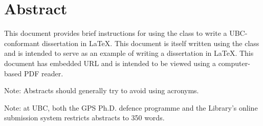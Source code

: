 
\chapter{Abstract}

This document provides brief instructions for using the 
class to write a UBC-conformant dissertation in \LaTeX.  This
document is itself written using the  class and is
intended to serve as an example of writing a dissertation in \LaTeX.
This document has embedded URL and is intended to be viewed
using a computer-based PDF reader.

Note: Abstracts should generally try to avoid using acronyms.

Note: at UBC, both the GPS Ph.D. defence programme and the
Library's online submission system restricts abstracts to 350
words.

